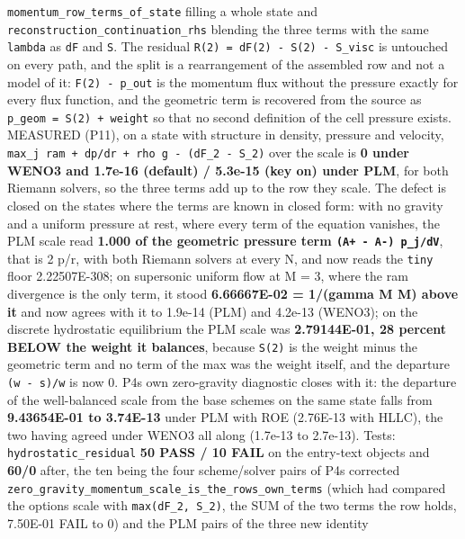 \documentclass[english,a4paper]{my_memo}
\begin{document}
\begin{itemize}
  \texttt{momentum\_row\_terms\_of\_state} filling a whole state and
  \texttt{reconstruction\_continuation\_rhs} blending the three terms with the same
  \texttt{lambda} as \texttt{dF} and \texttt{S}. The residual \texttt{R(2)\ =\ dF(2)\ -\ S(2)\ -\ S\_visc} is
  untouched on every path, and the split is a rearrangement of the assembled
  row and not a model of it: \texttt{F(2)\ -\ p\_out} is the momentum flux without the
  pressure exactly for every flux function, and the geometric term is
  recovered from the source as \texttt{p\_geom\ =\ S(2)\ +\ weight} so that no second
  definition of the cell pressure exists. MEASURED (P11), on a state with
  structure in density, pressure and velocity,
  \texttt{max\_j\ \textbar{}ram\ +\ dp/dr\ +\ rho\ g\ -\ (dF\_2\ -\ S\_2)\textbar{}} over the scale is \textbf{0 under
  WENO3 and 1.7e-16 (default) / 5.3e-15 (key on) under PLM}, for both Riemann
  solvers, so the three terms add up to the row they scale. The defect is
  closed on the states where the terms are known in closed form: with no
  gravity and a uniform pressure at rest, where every term of the equation
  vanishes, the PLM scale read \textbf{1.000 of the geometric pressure term
  \texttt{(A+\ -\ A-)\ p\_j/dV}}, that is 2 p/r, with both Riemann solvers at every N,
  and now reads the \texttt{tiny} floor 2.22507E-308; on supersonic uniform flow at
  M = 3, where the ram divergence is the only term, it stood \textbf{6.66667E-02 =
  1/(gamma M M) above it} and now agrees with it to 1.9e-14 (PLM) and
  4.2e-13 (WENO3); on the discrete hydrostatic equilibrium the PLM scale was
  \textbf{2.79144E-01, 28 percent BELOW the weight it balances}, because \texttt{S(2)} is
  the weight minus the geometric term and no term of the max was the weight
  itself, and the departure \texttt{(w\ -\ s)/w} is now 0. P4\textquotesingle s own zero-gravity
  diagnostic closes with it: the departure of the well-balanced scale from the
  base scheme\textquotesingle s on the same state falls from \textbf{9.43654E-01 to 3.74E-13} under
  PLM with ROE (2.76E-13 with HLLC), the two having agreed under WENO3 all
  along (1.7e-13 to 2.7e-13). Tests: \texttt{hydrostatic\_residual} \textbf{50 PASS / 10
  FAIL} on the entry-text objects and \textbf{60/0} after, the ten being the four
  scheme/solver pairs of P4\textquotesingle s corrected
  \texttt{zero\_gravity\_momentum\_scale\_is\_the\_rows\_own\_terms} (which had compared the
  option\textquotesingle s scale with \texttt{max(\textbar{}dF\_2\textbar{},\ \textbar{}S\_2\textbar{})}, the SUM of the two terms the row
  holds, 7.50E-01 FAIL to 0) and the PLM pairs of the three new identity

\end{itemize}
\end{document}
